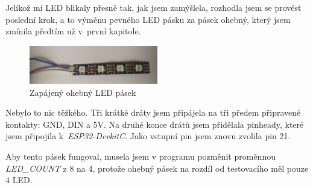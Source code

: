 Jelikož mi LED blikaly přesně tak, jak jsem zamýšlela, rozhodla jsem se provést poslední krok, a to výměnu pevného LED pásku za pásek ohebný, který jsem zmínila předtím už v~první kapitole. 

\begin{figure}[htbp]
	\centering
	\includegraphics[width=0.5\textwidth]{img/4Led2.jpg}
	\caption{Zapájený ohebný LED pásek}
\end{figure}

Nebylo to nic  těžkého. Tři krátké dráty jsem připájela na tři předem připravené kontakty: GND, DIN a 5V. Na druhé konce drátů jsem přidělala pinheady, které jsem připojila k~\textit{ESP32-DevkitC}. Jako vstupní pin jsem znovu zvolila pin 21.

Aby tento pásek fungoval, musela jsem v programu pozměnit proměnnou {\em LED\_COUNT} z 8 na 4, protože ohebný pásek na rozdíl od testovacího měl pouze 4 LED. 




